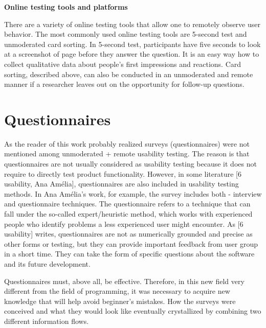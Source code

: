 \documentclass[a4paper,10pt,twoside]{article}
\begin{document}
\noindent \textbf {Online testing tools and platforms}

\noindent There are a variety of online testing tools that allow one to remotely observe user behavior. The most commonly used online testing tools are 5-second test and unmoderated card sorting.  In 5-second test, participants have five seconds to look at a screenshot of page before they answer the question. It is an easy way how to collect qualitative data about people’s first impressions and reactions. Card sorting, described above, can also be conducted in an unmoderated and remote manner if a researcher leaves out on the opportunity for follow-up questions.

\newpage
\vspace*{-1cm}
\section{Questionnaires}
\label{sec:questionnaires}


\noindent As the reader of this work probably realized surveys (questionnaires) were not mentioned among unmoderated + remote usability testing. The reason is that questionnaires are not usually considered as usability testing because it does not require to directly test product functionality. However, in some literature [6 usability, Ana Amélia], questionnaires are also included in usability testing methods. In Ana Amélia's work, for example, the survey includes both - interview and questionnaire techniques. The questionnaire refers to a technique that can fall under the so-called expert/heuristic method, which works with experienced people who identify problems a less experienced user might encounter. As [6 usability] writes, questionnaires are not as numerically grounded and precise as other forms or testing, but they can provide important feedback from user group in a short time. They can take the form of specific questions about the software and its future development. 

Questionnaires must, above all, be effective. Therefore, in this new field very different from the field of programming, it was necessary to acquire new knowledge that will help avoid beginner's mistakes. How the surveys were conceived and what they would look like eventually crystallized by combining two different information flows.
\end{document}
